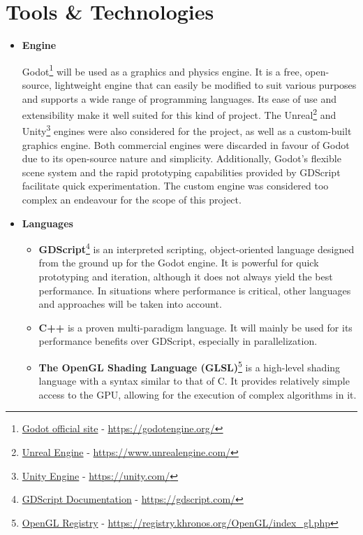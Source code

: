 \section{Tools \& Technologies}
\begin{itemize}
    \item{\textbf{Engine}}
    
    Godot\footnote{\href{https://godotengine.org/}{Godot official site} - \url{https://godotengine.org/}} will be used as a graphics and physics engine.
    It is a free, open-source, lightweight engine that can easily be modified to suit various purposes and supports a wide range of programming languages.
    Its ease of use and extensibility make it well suited for this kind of project.
    The Unreal\footnote{\href{https://www.unrealengine.com/}{Unreal Engine} - \url{https://www.unrealengine.com/}} and Unity\footnote{\href{https://unity.com/}{Unity Engine} - \url{https://unity.com/}} engines were also considered for the project, as well as a custom-built graphics engine.
    Both commercial engines were discarded in favour of Godot due to its open-source nature and simplicity.
    Additionally, Godot’s flexible scene system and the rapid prototyping capabilities provided by GDScript facilitate quick experimentation.
    The custom engine was considered too complex an endeavour for the scope of this project.
    \item{\textbf{Languages}} 
    \begin{itemize}        \item{\textbf{GDScript}}\footnote{\href{https://gdscript.com/}{GDScript Documentation} - \url{https://gdscript.com/}}
        is an interpreted scripting, object-oriented language designed from the ground up for the Godot engine.
        It is powerful for quick prototyping and iteration, although it does not always yield the best performance.
        In situations where performance is critical, other languages and approaches will be taken into account.
        \item{\textbf{C++}}
        is a proven multi-paradigm language.
        It will mainly be used for its performance benefits over GDScript, especially in parallelization.
        \item{\textbf{The OpenGL Shading Language (GLSL)}}\footnote{\href{https://registry.khronos.org/OpenGL/index\_gl.php}{OpenGL Registry} - \url{https://registry.khronos.org/OpenGL/index\_gl.php}}
        is a high-level shading language with a syntax similar to that of C.
        It provides relatively simple access to the GPU, allowing for the execution of complex algorithms in it.

\end{itemize}
\end{itemize}
